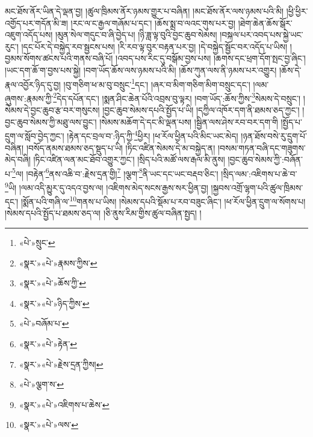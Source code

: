 མང་ཐོས་ནོར་ཡིན་དེ་ལྡན་བྱ། །ཚུལ་ཁྲིམས་ནོར་ཉམས་གྱུར་པ་བཞིན། །མང་ཐོས་ནོར་ལས་ཉམས་པའི་མི། །ཕྱི་ཕྱིར་འགྱོད་པར་གདོན་མི་ཟ། །རང་ལ་ང་རྒྱལ་གཞོམ་པ་དང་། །ཆོས་སྨྲ་བ་ལའང་གུས་པར་བྱ། །ཐེག་ཆེན་ཆོས་སྒོར་འཇུག་འདོད་པས། །མུན་སེལ་གདུང་བ་ཞི་བྱེད་པ། །ཉི་ཟླ་ལྟ་བུའི་བྱང་ཆུབ་སེམས། །བསྐལ་པར་འབད་པས་སྐྱེ་ཡང་རུང་། །དང་པོར་དེ་བསྐྱེད་རབ་སྦྱངས་པས། །རི་རབ་ལྟ་བུར་བརྟན་པར་བྱ། །དེ་བསྐྱེད་སྦྱོང་བར་འདོད་པ་ཡིས། །བྱམས་སོགས་ཚངས་པའི་གནས་བཞི་པོ། །འབད་པས་རིང་དུ་བསྒོམ་བྱས་པས། །ཆགས་དང་ཕྲག་དོག་སྤང་བྱ་ཞིང་། །ཡང་དག་ཆོ་ག་བྱས་པས་སྐྱེ། །བག་ཡོད་ཆོས་ལས་ཉམས་པའི་མི། །ཆོས་ཀུན་ལས་ནི་ཉམས་པར་འགྱུར། །ཆོས་དེ་རྣལ་འབྱོར་ཉིད་དུ་བྱ། །བུ་གཅིག་ཕ་མ་བུ་བསྲུང་\footnote{«པེ་»སྲུང་}དང་། །ཞར་བ་མིག་གཅིག་མིག་བསྲུང་དང་། །ལམ་ཞུགས་:རྣམས་ཀྱི་\footnote{«སྣར་»«པེ་»རྣམས་ཀྱིས་}དེད་དཔོན་དང་། །སྨན་ཤིང་ཆེན་པོའི་འབྲས་བུ་ལྟར། །བག་ཡོད་:ཆོས་ཀྱིས་\footnote{«སྣར་»«པེ་»ཆོས་ཀྱི་}སེམས་དེ་བསྲུང་། །སེམས་དེ་བྱང་ཆུབ་རྩ་བར་གསུངས། །བྱང་ཆུབ་སེམས་དཔའི་སྤྱོད་པ་ཡི། །དཀྱིལ་འཁོར་དག་ནི་ཐམས་ཅད་ཀྱང་། །བྱང་ཆུབ་སེམས་ཀྱི་མཐུ་ལས་བྱུང་། །སེམས་མཆོག་དེ་དང་མི་ལྡན་པས། །སྦྱིན་ལས་ཤེས་རབ་བར་དག་གི །སྤྱོད་པ་དྲུག་ལ་སློབ་བྱེད་ཀྱང་། །རྟེན་དང་བྲལ་བ་:ཉིད་ཀྱི་\footnote{«སྣར་»«པེ་»ཉིད་ཀྱིས་}ཕྱིར། །ཕ་རོལ་ཕྱིན་པའི་མིང་ཡང་མེད། །ཉན་ཐོས་བསེ་རུ་དྲུག་པོ་བཞིན། །བསོད་ནམས་ཐམས་ཅད་སྡུད་པ་ཡི། །ཏིང་འཛིན་སེམས་དེ་མ་བསྐྱེད་ན། །བསམ་གཏན་བཞི་དང་གཟུགས་མེད་བཞི། །ཏིང་འཛིན་ལན་མང་ཐོབ་འགྱུར་ཀྱང་། །སྲིད་པའི་མཚོ་ལས་རྒལ་མི་ནུས། །བྱང་ཆུབ་སེམས་ཀྱི་:བཞོན་པ་\footnote{«པེ་»བཞོམ་པ་}ལ། །བརྟེན་\footnote{«སྣར་»«པེ་»རྟེན་}ནས་འཆི་བ་:རྗེས་དྲན་གྱི།\footnote{«སྣར་»«པེ་»རྗེས་དྲན་ཀྱིས།} །ལྕག་\footnote{«པེ་»ལྕག་ས་}ནི་ཡང་དང་ཡང་བརྡབ་ཅིང་། །སྲིད་ལམ་:འཇིགས་པ་ཆེ་བ་\footnote{«སྣར་»«པེ་»འཇིགས་པ་ཆེས་}ཡི། །ལམ་འདི་མྱུར་དུ་འདའ་བྱས་ལ། །འཇིགས་མེད་སངས་རྒྱས་སར་ཕྱིན་བྱ། །སྐྱབས་འགྲོ་ལྷག་པའི་ཚུལ་ཁྲིམས་དང་། །སྨོན་པའི་གཞི་ལ་\footnote{«སྣར་»«པེ་»ལས་}གནས་པ་ཡིས། །སེམས་དཔའི་སྡོམ་པ་རབ་བཟུང་ཞིང་། །ཕ་རོལ་ཕྱིན་དྲུག་ལ་སོགས་པ། །སེམས་དཔའི་སྤྱོད་པ་ཐམས་ཅད་ལ། །ཅི་ནུས་རིམ་གྱིས་ཚུལ་བཞིན་སྤྱད། །
